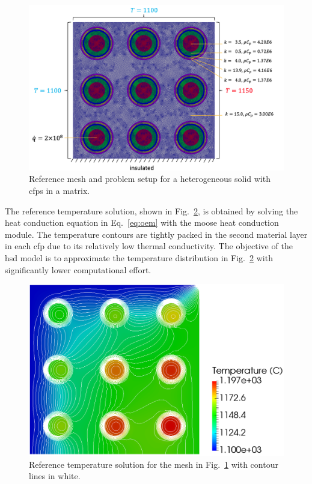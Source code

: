 \begin{figure}[!h]
\centering
\hspace{1cm}
  \includegraphics[width=0.75\linewidth]{figs/multiscale_9_problem.png}
\caption{Reference mesh and problem setup for a heterogeneous solid with \glspl{cfp} in a matrix.}
\label{fig:nine_particle_mesha}
\end{figure}

The reference temperature solution, shown in Fig.\ \ref{fig:nine_particle_mesh}, is obtained by solving the heat conduction equation in Eq.\ \eqref{eq:oem} with the \gls{moose} heat conduction module. The temperature contours are tightly packed in the second material layer in each \gls{cfp} due to its relatively low thermal conductivity. The objective of the \gls{hsd} model is to approximate the temperature distribution in Fig.\ \ref{fig:nine_particle_mesh} with significantly lower computational effort.

\begin{figure}[!h]
  \centering
  \hspace{3.2cm}
  \includegraphics[width=0.63\linewidth]{figs/compact_9_reference.png}
\caption{Reference temperature solution for the mesh in Fig.\ \ref{fig:nine_particle_mesha} with contour lines in white.}
\label{fig:nine_particle_mesh}
\end{figure}

